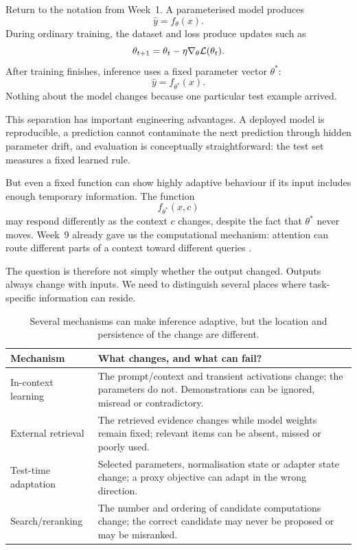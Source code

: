 Return to the notation from Week~1. A parameterised model produces
\[
  \hat{y}=f_\theta(x).
\]
During ordinary training, the dataset and loss produce updates such as
\[
  \theta_{t+1}=\theta_t-\eta\nabla_\theta\mathcal{L}(\theta_t).
\]
After training finishes, inference uses a fixed parameter vector \(\theta^*\):
\[
  \hat{y}=f_{\theta^*}(x).
\]
Nothing about the model changes because one particular test example arrived.

This separation has important engineering advantages. A deployed model is reproducible, a prediction cannot contaminate the next prediction through hidden parameter drift, and evaluation is conceptually straightforward: the test set measures a fixed learned rule.

But even a fixed function can show highly adaptive behaviour if its input includes enough temporary information. The function
\[
  f_{\theta^*}(x,c)
\]
may respond differently as the context \(c\) changes, despite the fact that \(\theta^*\) never moves. Week~9 already gave us the computational mechanism: attention can route different parts of a context toward different queries \parencite{vaswani2017}.

The question is therefore not simply whether the output changed. Outputs always change with inputs. We need to distinguish several places where task-specific information can reside.

\begin{table}[ht]
\centering
\small
\begin{tabular}{p{}p{}}
\toprule
Mechanism & What changes, and what can fail? \\
\midrule
In-context learning & The prompt/context and transient activations change; the parameters do not. Demonstrations can be ignored, misread or contradictory. \\
External retrieval & The retrieved evidence changes while model weights remain fixed; relevant items can be absent, missed or poorly used. \\
Test-time adaptation & Selected parameters, normalisation state or adapter state change; a proxy objective can adapt in the wrong direction. \\
Search/reranking & The number and ordering of candidate computations change; the correct candidate may never be proposed or may be misranked. \\
\bottomrule
\end{tabular}
\caption{Several mechanisms can make inference adaptive, but the location and persistence of the change are different.}
\label{tab:week11-taxonomy}
\end{table}

